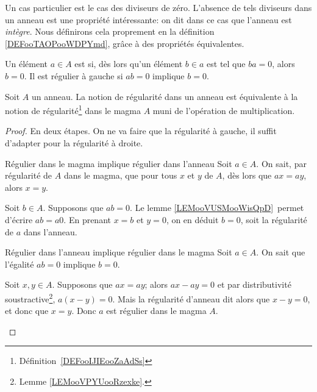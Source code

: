 \begin{normaltext}	\label{NORMooAnneauIntegreIntro}
	Un cas particulier est le cas des diviseurs de zéro. L'absence de tels diviseurs dans un anneau est une propriété intéressante: on dit dans ce cas que l'anneau est \emph{intègre}. Nous définirons cela proprement en la définition \ref{DEFooTAOPooWDPYmd}, grâce à des propriétés équivalentes.
\end{normaltext}

\begin{definition}\label{DEFooAnneauEltRegulier}
	Un élément \( a\in A\) est  si, dès lors qu'un élément \( b \in a \) est tel que \( ba=0\), alors \( b=0\). Il est régulier à gauche si \( ab=0\) implique \( b=0\).
\end{definition}

\begin{proposition}	\label{PROPooRegulierMagmaAnneau}
	Soit \( A \) un anneau. La notion de régularité dans un anneau est équivalente à la notion de régularité\footnote{Définition~\ref{DEFooIJIEooZaAdSs}} dans le magma \( A \) muni de l'opération de multiplication.
\end{proposition}

\begin{proof}
	En deux étapes. On ne va faire que la régularité à gauche, il suffit d'adapter pour la régularité à droite.
	\begin{subproof}
		\item[Régulier dans le magma implique régulier dans l'anneau]
		Soit \( a \in A \). On sait, par régularité de \( A \) dans le magma, que pour tous \( x \) et \( y \) de \( A \), dès lors que \( ax = ay \), alors \( x = y \).

		Soit \( b \in A \). Supposons que \( ab = 0 \). Le lemme \ref{LEMooVUSMooWisQpD} permet d'écrire \( ab = a0 \). En prenant \( x = b \) et \( y = 0 \), on en déduit \( b = 0 \), soit la régularité de \( a \) dans l'anneau.
		\item[Régulier dans l'anneau implique régulier dans le magma]
		Soit \( a \in A \). On sait que l'égalité \( ab=0\) implique \( b=0\).

		Soit \( x, y \in A \). Supposons que \( ax = ay \); alors \( ax - ay = 0 \) et par distributivité soustractive\footnote{Lemme \ref{LEMooVPYUooRzexke}.}, \( a(x-y) = 0\). Mais la régularité d'anneau dit alors que \( x - y = 0 \), et donc que \( x = y\). Donc \( a \) est régulier dans le magma \( A \).
	\end{subproof}
\end{proof}

